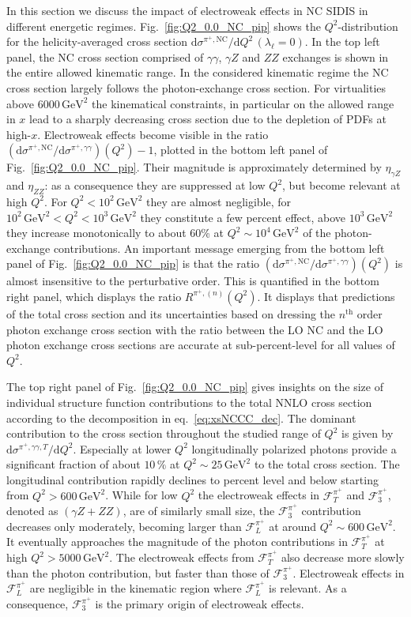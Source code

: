 \documentclass[11pt,a4paper]{article}
\newcommand{\Fcal}{\mathcal{F}}
\newcommand{\dd}{\mathrm{d}}
\newcommand{\NC}{\mathrm{NC}}
\newcommand{\GeV}{\mathrm{GeV}}
\begin{document}
In this section we discuss the impact of electroweak effects in $\NC$ SIDIS in different energetic regimes.
Fig.~\ref{fig:Q2_0.0_NC_pip} shows the $Q^2$-distribution for the helicity-averaged cross section $\dd \sigma^{\pi^+,\NC}/\dd Q^2\, (\lambda_\ell = 0)$.
In the top left panel, the $\NC$ cross section comprised of $\gamma\gamma$, $\gamma Z$ and $ZZ$ exchanges is shown in the entire allowed kinematic range.
In the considered kinematic regime the $\NC$ cross section largely follows the photon-exchange cross section.
For virtualities above $6000\, \GeV^2$ the kinematical constraints, in particular on the allowed range in $x$ lead to a sharply decreasing cross section due to the depletion of PDFs at high-$x$.
Electroweak effects become visible in the ratio $(\dd\sigma^{\pi^+,\NC}/\dd\sigma^{\pi^+,\gamma\gamma}) (Q^2) -1$,
plotted in the bottom left panel of Fig.~\ref{fig:Q2_0.0_NC_pip}.
%
Their magnitude is approximately determined by $\eta_{\gamma Z}$ and $\eta_{ZZ}$:
as a consequence they are suppressed at low $Q^2$, but become relevant at high $Q^2$.
For $Q^2 < 10^2\,\GeV^2$ they are almost negligible, for $10^2\,\GeV^2< Q^2 < 10^3\,\GeV^2$ they constitute a few percent effect, above $10^3\,\GeV^2$ they increase monotonically to about 60\% at $Q^2 \sim 10^4\,\GeV^2$ of the photon-exchange contributions.
An important message emerging from the bottom left panel of Fig.~\ref{fig:Q2_0.0_NC_pip} is that
the ratio $(\dd\sigma^{\pi^+,\mathrm{NC}}/\dd\sigma^{\pi^+,\gamma\gamma})(Q^2)$ is almost insensitive to the perturbative order.
This is quantified in the bottom right panel, which displays the ratio $R^{\pi^+,(n)}(Q^2)$.
It displays that predictions of the total cross section and its uncertainties based on dressing the $n^\text{th}$ order photon exchange cross section with the ratio between the LO $\NC$ and the LO photon exchange cross sections are accurate at sub-percent-level
for all values of $Q^2$.

The top right panel of Fig.~\ref{fig:Q2_0.0_NC_pip} gives insights on the size of individual structure function contributions to the total NNLO cross section according to the decomposition in eq.~\eqref{eq:xsNCCC_dec}.
The dominant contribution to the cross section throughout the studied range of $Q^2$ is given by $\dd\sigma^{\pi^+,\gamma\gamma,T}/\dd Q^2$.
Especially at lower $Q^2$ longitudinally polarized photons provide a significant fraction of about $10\,\%$ at $Q^2\sim 25\,\GeV^2$ to the total cross section.
The longitudinal contribution rapidly declines to percent level and below starting from $Q^2 > 600\,\GeV^2$.
%
While for low $Q^2$ the electroweak effects in $\Fcal^{\pi^+}_T$ and $\Fcal^{\pi^+}_3$, denoted as $(\gamma Z + ZZ)$, are of similarly small size, the $\Fcal^{\pi^+}_3$ contribution decreases only moderately, becoming larger than $\Fcal^{\pi^+}_L$ at around $Q^2 \sim 600\, \GeV^2$.
It eventually approaches the magnitude of the photon contributions in $\Fcal^{\pi^+}_T$ at high $Q^2>5000\,\GeV^2$.
The electroweak effects from $\Fcal^{\pi^+}_T$ also decrease more slowly than the photon contribution, but faster than those of $\Fcal^{\pi^+}_3$.
Electroweak effects in $\Fcal^{\pi^+}_L$ are negligible in the kinematic region where $\Fcal^{\pi^+}_L$ is relevant.
As a consequence, $\Fcal^{\pi^+}_3$ is the primary origin of electroweak effects.
\end{document}
